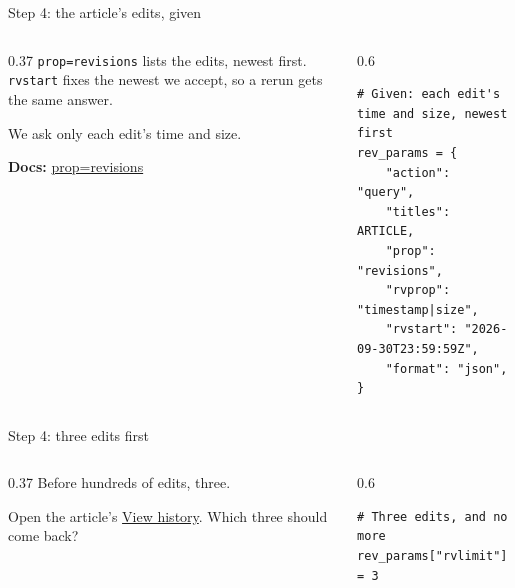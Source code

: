 \documentclass[9pt,aspectratio=169]{beamer}
\begin{document}
\begin{frame}[fragile]{Step 4: the article's edits, given}
    \begin{columns}[T]
        \begin{column}{0.37\textwidth}
            \texttt{prop=revisions} lists the edits, newest first. \texttt{rvstart} fixes the newest we accept, so a rerun gets the same answer.

            \medskip
            We ask only each edit's time and size.

            \medskip
            {\scriptsize\textbf{Docs:} \href{https://www.mediawiki.org/wiki/API:Revisions}{prop=revisions}\par}
        \end{column}
        \begin{column}{0.6\textwidth}
\begin{lstlisting}
# Given: each edit's time and size, newest first
rev_params = {
    "action": "query",
    "titles": ARTICLE,
    "prop": "revisions",
    "rvprop": "timestamp|size",
    "rvstart": "2026-09-30T23:59:59Z",
    "format": "json",
}
\end{lstlisting}
        \end{column}
    \end{columns}
\end{frame}

\begin{frame}[fragile]{Step 4: three edits first}
    \begin{columns}[T]
        \begin{column}{0.37\textwidth}
            Before hundreds of edits, three.

            \medskip
            Open the article's \href{https://en.wikipedia.org/w/index.php?title=University_of_Colorado_Boulder&action=history}{View history}. Which three should come back?
        \end{column}
        \begin{column}{0.6\textwidth}
\begin{lstlisting}
# Three edits, and no more
rev_params["rvlimit"] = 3
\end{lstlisting}
        \end{column}
    \end{columns}
\end{frame}
\end{document}
